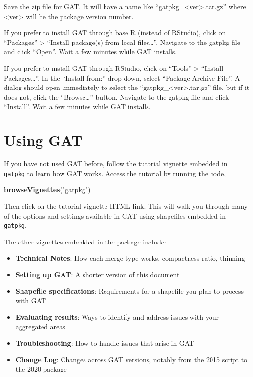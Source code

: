 \documentclass[
]{article}
\newenvironment{Shaded}{\begin{snugshade}}{\end{snugshade}}
\newcommand{\KeywordTok}[1]{\textcolor[rgb]{0.13,0.29,0.53}{\textbf{#1}}}
\newcommand{\NormalTok}[1]{#1}
\newcommand{\StringTok}[1]{\textcolor[rgb]{0.31,0.60,0.02}{#1}}
\providecommand{\tightlist}{%
  \setlength{\itemsep}{0pt}\setlength{\parskip}{0pt}}
\begin{document}
Save the zip file for GAT. It will have a name like
``gatpkg\_\textless ver\textgreater.tar.gz'' where
\textless ver\textgreater{} will be the package version number.

If you prefer to install GAT through base R (instead of RStudio), click
on ``Packages'' \textgreater{} ``Install package(s) from local
files\ldots{}''. Navigate to the gatpkg file and click ``Open''. Wait a
few minutes while GAT installs.

If you prefer to install GAT through RStudio, click on ``Tools''
\textgreater{} ``Install Packages\ldots{}''. In the ``Install from:''
drop-down, select ``Package Archive File''. A dialog should open
immediately to select the ``gatpkg\_\textless ver\textgreater.tar.gz''
file, but if it does not, click the ``Browse\ldots{}'' button. Navigate
to the gatpkg file and click ``Install''. Wait a few minutes while GAT
installs.

\hypertarget{using-gat}{%
\section{Using GAT}\label{using-gat}}

If you have not used GAT before, follow the tutorial vignette embedded
in \texttt{gatpkg} to learn how GAT works. Access the tutorial by
running the code,

\begin{Shaded}
\begin{Highlighting}[]
\KeywordTok{browseVignettes}\NormalTok{(}\StringTok{"gatpkg"}\NormalTok{)}
\end{Highlighting}
\end{Shaded}

Then click on the tutorial vignette HTML link. This will walk you
through many of the options and settings available in GAT using
shapefiles embedded in \texttt{gatpkg}.

The other vignettes embedded in the package include:

\begin{itemize}
\tightlist
\item
  \textbf{Technical Notes}: How each merge type works, compactness
  ratio, thinning
\item
  \textbf{Setting up GAT}: A shorter version of this document
\item
  \textbf{Shapefile specifications}: Requirements for a shapefile you
  plan to process with GAT
\item
  \textbf{Evaluating results}: Ways to identify and address issues with
  your aggregated areas
\item
  \textbf{Troubleshooting}: How to handle issues that arise in GAT
\item
  \textbf{Change Log}: Changes across GAT versions, notably from the
  2015 script to the 2020 package
\end{itemize}
\end{document}
